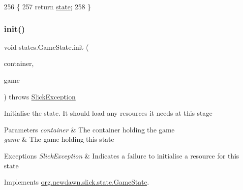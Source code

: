 \begin{DoxyCode}
256                           \{
257         \textcolor{keywordflow}{return} \mbox{\hyperlink{classstates_1_1_game_state_a5e07b1776e13d009e1a8c6a1e8140d04}{state}};
258     \}
\end{DoxyCode}
\mbox{\label{classstates_1_1_game_state_a3fe60e1878feb13a073438a647273343}} 
\subsubsection{\texorpdfstring{init()}{init()}}
{\footnotesize\ttfamily void states.\+Game\+State.\+init (\begin{DoxyParamCaption}\item[{\mbox{\hyperlink{classorg_1_1newdawn_1_1slick_1_1_game_container}{Game\+Container}}}]{container,  }\item[{\mbox{\hyperlink{classorg_1_1newdawn_1_1slick_1_1state_1_1_state_based_game}{State\+Based\+Game}}}]{game }\end{DoxyParamCaption}) throws \mbox{\hyperlink{classorg_1_1newdawn_1_1slick_1_1_slick_exception}{Slick\+Exception}}\hspace{0.3cm}{\ttfamily [inline]}}

Initialise the state. It should load any resources it needs at this stage


\begin{DoxyParams}{Parameters}
{\em container} & The container holding the game \\
\hline
{\em game} & The game holding this state \\
\hline
\end{DoxyParams}

\begin{DoxyExceptions}{Exceptions}
{\em Slick\+Exception} & Indicates a failure to initialise a resource for this state \\
\hline
\end{DoxyExceptions}


Implements \mbox{\hyperlink{interfaceorg_1_1newdawn_1_1slick_1_1state_1_1_game_state_aa799a369e0fcfe6822d2d586fa6f5bbc}{org.\+newdawn.\+slick.\+state.\+Game\+State}}.


